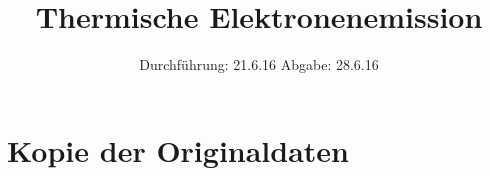 

\subject{V 504}
\title{Thermische Elektronenemission}
\date{
  Durchführung: 21.6.16
  \hspace{3em}
  Abgabe: 28.6.16
}



\maketitle
\thispagestyle{empty}
\tableofcontents
\newpage






\printbibliography

\appendix
\section{Kopie der Originaldaten}


